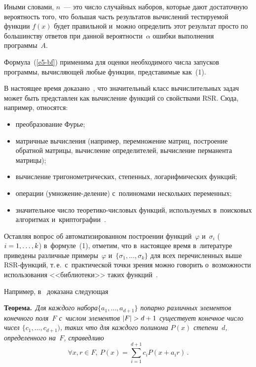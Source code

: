 \begin{multicols}{2}
    Иными словами, $n$~--- это число случайных наборов, которые дают 
достаточную вероятность того, что большая часть результатов вычислений 
тестируемой функции $f(x)$ будет правильной и~можно определить этот 
результат просто по большинству ответов при данной вероятности~$\alpha$ 
ошибки выполнения программы~$A$.
    
    Формула~(\ref{e5-bf}) применима для оценки необходимого числа 
запусков программы, вычисляющей любые функции, представимые как~(1).
    
    В настоящее время доказано~\cite{14-bf, 15-bf}, что значительный класс 
вычислительных задач может быть представлен как вычисление функций со 
свойствами RSR. Сюда, например, относятся:
    \begin{itemize}
  \item  преобразование Фурье;
  \item матричные вычисления (например, перемножение матриц, 
построение обратной матрицы, вычисление определителей, вычисление 
перманента матрицы);
  \item вычисление тригонометрических, степенных, логарифмических 
функций;
  \item операции (умножение-деление) с~полиномами нескольких 
переменных;
  \item значительное число теоретико-числовых функций, используемых 
в~поисковых алгоритмах и~криптографии~\cite{15-bf}.
  \end{itemize}
  
  Оставляя вопрос об автоматизированном построении функций~$\varphi$ 
и~$\sigma_i$ ($i\hm = 1, \ldots, k$) в~формуле~(1), отметим, что в~настоящее 
время в~литературе приведены различные примеры~$\varphi$ и~$\{\sigma_1, 
\ldots , \sigma_k\}$ для всех перечисленных выше RSR-функ\-ций, т.\,е.\ 
с~практической точки зрения можно говорить о~возможности использования 
<<биб\-лио\-те\-ки>> таких функций~\cite{6-bf}.
  
    Например, в~\cite{14-bf} доказана следующая
    
    \smallskip
    
    \noindent
    \textbf{Теорема.}\ \textit{Для каждого набора$\{a_1, \ldots , a_{d+1}\}$ 
попарно различных элементов конечного поля~$F$ с~числом элементов $\vert 
F\vert \hm> d\hm+1$ существует конечное число чисел $\{c_1, \ldots , 
c_{d+1})$, таких что для каждого полинома $P(x)$ степени~$d$, 
определенного на~$F$, справедливо}
    \begin{equation*}
    \forall x, r\in F,\ P(x)=\sum\limits_{i=1}^{d+1} c_i P\left( x+a_i r\right)\,.
    \end{equation*}
    

\end{multicols}
